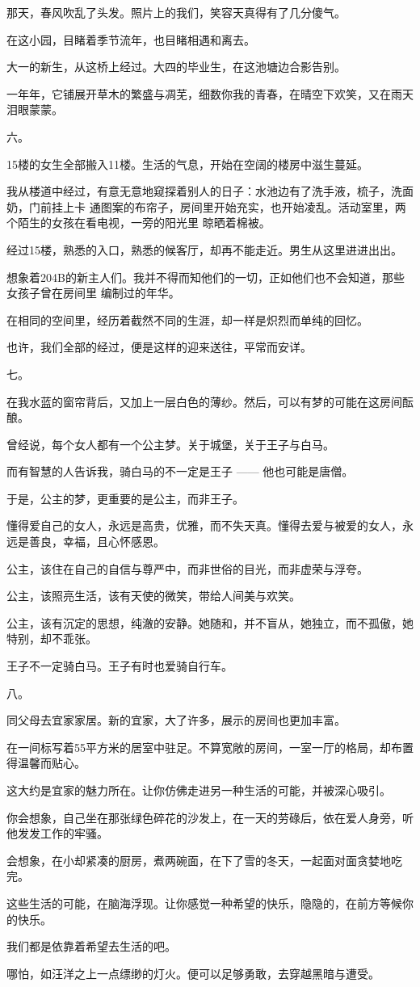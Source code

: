 \documentclass[12pt,a4paper]{article}
\newcommand{\subpart}[1]{
	\begingroup \par
	\vspace{1ex} \centering #1
	\par \endgroup
}
\begin{document}
		那天，春风吹乱了头发。照片上的我们，笑容天真得有了几分傻气。\par
		在这小园，目睹着季节流年，也目睹相遇和离去。\par
		大一的新生，从这桥上经过。大四的毕业生，在这池塘边合影告别。\par
		一年年，它铺展开草木的繁盛与凋芜，细数你我的青春，在晴空下欢笑，又在雨天泪眼蒙蒙。

		\subpart{六。}

		15楼的女生全部搬入11楼。生活的气息，开始在空阔的楼房中滋生蔓延。

		我从楼道中经过，有意无意地窥探着别人的日子：水池边有了洗手液，梳子，洗面奶，门前挂上卡
	通图案的布帘子，房间里开始充实，也开始凌乱。活动室里，两个陌生的女孩在看电视，一旁的阳光里
	晾晒着棉被。

		经过15楼，熟悉的入口，熟悉的候客厅，却再不能走近。男生从这里进进出出。

		想象着204B的新主人们。我并不得而知他们的一切，正如他们也不会知道，那些女孩子曾在房间里
	编制过的年华。

		在相同的空间里，经历着截然不同的生涯，却一样是炽烈而单纯的回忆。

		也许，我们全部的经过，便是这样的迎来送往，平常而安详。

		\subpart{七。}

		在我水蓝的窗帘背后，又加上一层白色的薄纱。然后，可以有梦的可能在这房间酝酿。\par
		曾经说，每个女人都有一个公主梦。关于城堡，关于王子与白马。\par
		而有智慧的人告诉我，骑白马的不一定是王子 —— 他也可能是唐僧。\par
		于是，公主的梦，更重要的是公主，而非王子。\par
		懂得爱自己的女人，永远是高贵，优雅，而不失天真。懂得去爱与被爱的女人，永远是善良，幸福，且心怀感恩。\par
		公主，该住在自己的自信与尊严中，而非世俗的目光，而非虚荣与浮夸。\par
		公主，该照亮生活，该有天使的微笑，带给人间美与欢笑。\par
		公主，该有沉定的思想，纯澈的安静。她随和，并不盲从，她独立，而不孤傲，她特别，却不乖张。\par
		王子不一定骑白马。王子有时也爱骑自行车。

		\subpart{八。}

		同父母去宜家家居。新的宜家，大了许多，展示的房间也更加丰富。\par
		在一间标写着55平方米的居室中驻足。不算宽敞的房间，一室一厅的格局，却布置得温馨而贴心。\par
		这大约是宜家的魅力所在。让你仿佛走进另一种生活的可能，并被深心吸引。\par
		你会想象，自己坐在那张绿色碎花的沙发上，在一天的劳碌后，依在爱人身旁，听他发发工作的牢骚。\par
		会想象，在小却紧凑的厨房，煮两碗面，在下了雪的冬天，一起面对面贪婪地吃完。\par
		这些生活的可能，在脑海浮现。让你感觉一种希望的快乐，隐隐的，在前方等候你的快乐。\par
		我们都是依靠着希望去生活的吧。\par
		哪怕，如汪洋之上一点缥缈的灯火。便可以足够勇敢，去穿越黑暗与遭受。
\end{document}
